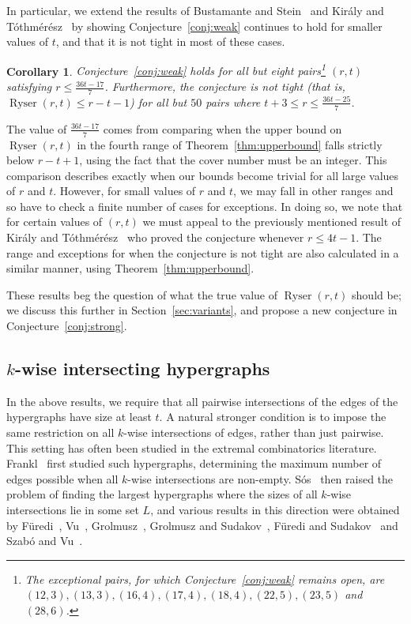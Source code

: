 \documentclass[a4paper,twoside,11pt]{article}
\newtheorem{cor}[thm]{Corollary}
\numberwithin{thm}{section}
\theoremstyle{definition}
\theoremstyle{remark}
\theoremstyle{definition}
\DeclareMathOperator{\Ryser}{Ryser}
\begin{document}
In particular, we extend the results of Bustamante and Stein~\cite{bustastein} and Kir\'aly and T\'othm\'er\'esz~\cite{kirtot} by showing Conjecture~\ref{conj:weak} continues to hold for smaller values of $t$, and that it is not tight in most of these cases.

\begin{cor} \label{cor:comparisons}
Conjecture~\ref{conj:weak} holds for all but eight pairs\footnote{The  exceptional pairs, for which Conjecture~\ref{conj:weak} remains open, are $(12,3), (13,3), (16,4), (17,4), (18,4), (22,5), (23,5)$ and $(28,6)$.} $(r,t)$ satisfying $r \le \frac{36t - 17}{7}$.  Furthermore, the conjecture is not tight (that is, $\Ryser(r,t) \le r - t - 1$) for all but $50$ pairs where $t+3 \leq r \le \frac{36t - 25}{7}$.
\end{cor}


The value of $\frac{36t-17}{7}$ comes from comparing when the upper bound on $\Ryser(r,t)$ in the fourth range of Theorem~\ref{thm:upperbound} falls strictly below $r-t+1$, using the fact that the cover number must be an integer. This comparison describes exactly when our bounds become trivial for all large values of $r$ and $t$. However, for  small values of $r$ and $t$, we may fall in other ranges and so have to check a finite number of cases for exceptions. In doing so, we note that for certain values of $(r,t)$ we must appeal to the previously mentioned result of Kir\'aly and T\'othm\'er\'esz~\cite{kirtot} who proved the conjecture  whenever $r\leq 4t-1$.  The range and exceptions for when the conjecture is not tight are also calculated in a similar manner, using Theorem~\ref{thm:upperbound}. 

These results beg the question of what the true value of $\Ryser(r,t)$ should be; we discuss this further in Section~\ref{sec:variants}, and propose a new conjecture in Conjecture~\ref{conj:strong}.


\subsection{$k$-wise intersecting hypergraphs}

In the above results, we require that all pairwise intersections of the edges of the hypergraphs have size at least $t$. A natural stronger condition is to impose the same restriction on all $k$-wise intersections of edges, rather than just pairwise. This setting has often been studied in the extremal combinatorics literature. Frankl~\cite{frankl76} first studied such hypergraphs, determining the maximum number of edges possible when all $k$-wise intersections are non-empty. S\'os~\cite{sos73} then raised the problem of finding the largest hypergraphs where the sizes of all $k$-wise intersections lie in some set $L$, and various results in this direction were obtained by F\"uredi~\cite{furedi83}, Vu~\cite{vu97, vu99}, Grolmusz~\cite{grolmusz02}, Grolmusz and Sudakov~\cite{grolsuda02}, F\"uredi and Sudakov~\cite{furesuda04} and Szab\'o and Vu~\cite{szabovu05}.
\end{document}
